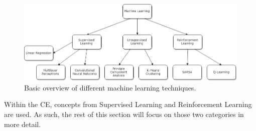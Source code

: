 	\begin{figure}[ht]
		\centering
		\caption{Basic overview of different machine learning techniques.}
		\includegraphics[scale=0.5]{figures/MLdiagram.png}
	\end{figure}
	
	\par Within the CE, concepts from Supervised Learning and Reinforcement Learning are used. As such, the rest of this section will focus on those two categories in more detail.%

